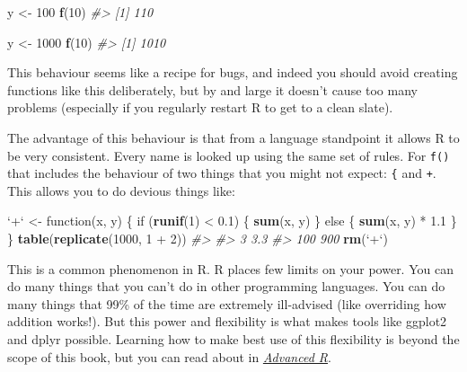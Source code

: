 \documentclass[]{book}
\newenvironment{Shaded}{\begin{snugshade}}{\end{snugshade}}
\newcommand{\KeywordTok}[1]{\textcolor[rgb]{0.13,0.29,0.53}{\textbf{{#1}}}}
\newcommand{\DataTypeTok}[1]{\textcolor[rgb]{0.13,0.29,0.53}{{#1}}}
\newcommand{\DecValTok}[1]{\textcolor[rgb]{0.00,0.00,0.81}{{#1}}}
\newcommand{\FloatTok}[1]{\textcolor[rgb]{0.00,0.00,0.81}{{#1}}}
\newcommand{\StringTok}[1]{\textcolor[rgb]{0.31,0.60,0.02}{{#1}}}
\newcommand{\CommentTok}[1]{\textcolor[rgb]{0.56,0.35,0.01}{\textit{{#1}}}}
\newcommand{\NormalTok}[1]{{#1}}
\begin{document}
\begin{Shaded}
\begin{Highlighting}[]
\NormalTok{y <-}\StringTok{ }\DecValTok{100}
\KeywordTok{f}\NormalTok{(}\DecValTok{10}\NormalTok{)}
\CommentTok{#> [1] 110}

\NormalTok{y <-}\StringTok{ }\DecValTok{1000}
\KeywordTok{f}\NormalTok{(}\DecValTok{10}\NormalTok{)}
\CommentTok{#> [1] 1010}
\end{Highlighting}
\end{Shaded}

This behaviour seems like a recipe for bugs, and indeed you should avoid
creating functions like this deliberately, but by and large it doesn't
cause too many problems (especially if you regularly restart R to get to
a clean slate).

The advantage of this behaviour is that from a language standpoint it
allows R to be very consistent. Every name is looked up using the same
set of rules. For \texttt{f()} that includes the behaviour of two things
that you might not expect: \texttt{\{} and \texttt{+}. This allows you
to do devious things like:

\begin{Shaded}
\begin{Highlighting}[]
\StringTok{`}\DataTypeTok{+}\StringTok{`} \NormalTok{<-}\StringTok{ }\NormalTok{function(x, y) \{}
  \NormalTok{if (}\KeywordTok{runif}\NormalTok{(}\DecValTok{1}\NormalTok{) <}\StringTok{ }\FloatTok{0.1}\NormalTok{) \{}
    \KeywordTok{sum}\NormalTok{(x, y)}
  \NormalTok{\} else \{}
    \KeywordTok{sum}\NormalTok{(x, y) *}\StringTok{ }\FloatTok{1.1}
  \NormalTok{\}}
\NormalTok{\}}
\KeywordTok{table}\NormalTok{(}\KeywordTok{replicate}\NormalTok{(}\DecValTok{1000}\NormalTok{, }\DecValTok{1} \NormalTok{+}\StringTok{ }\DecValTok{2}\NormalTok{))}
\CommentTok{#> }
\CommentTok{#>   3 3.3 }
\CommentTok{#> 100 900}
\KeywordTok{rm}\NormalTok{(}\StringTok{`}\DataTypeTok{+}\StringTok{`}\NormalTok{)}
\end{Highlighting}
\end{Shaded}

This is a common phenomenon in R. R places few limits on your power. You
can do many things that you can't do in other programming languages. You
can do many things that 99\% of the time are extremely ill-advised (like
overriding how addition works!). But this power and flexibility is what
makes tools like ggplot2 and dplyr possible. Learning how to make best
use of this flexibility is beyond the scope of this book, but you can
read about in \href{http://adv-r.had.co.nz}{\emph{Advanced R}}.
\end{document}
